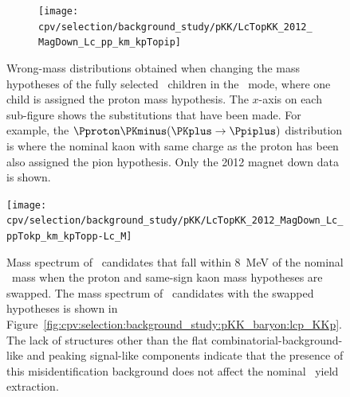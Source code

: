 \begin{figure}
  \begin{subfigure}[b]{0.3\textwidth}
    \texttt{[image: cpv/selection/background\_study/pKK/LcTopKK\_2012\_MagDown\_Lc\_pp\_km\_kpTopip]}
    \caption{\decay{\PLambdac}{\Pproton\PKminus\Ppiplus}}
    \label{fig:cpv:selection:background_study:pKK_baryon:lcp_pkpi}
  \end{subfigure}

  \caption{%
    Wrong-mass distributions obtained when changing the mass hypotheses of the 
    fully selected \PLambdac\ children in the \pKK\ mode, where one child is 
    assigned the proton mass hypothesis.
    The $x$-axis on each sub-figure shows the substitutions that have been 
    made.
    For example, the ${\Pproton\PKminus(\PKplus \to \Ppiplus)}$ distribution is where the 
    nominal kaon with same charge as the proton has been also assigned the pion 
    hypothesis.
    Only the 2012 magnet down data is shown.
  }
  \label{fig:cpv:selection:background_study:pKK_baryon}
\end{figure}

\begin{figure}
  \centering
  \texttt{[image: cpv/selection/background\_study/pKK/LcTopKK\_2012\_MagDown\_Lc\_ppTokp\_km\_kpTopp-Lc\_M]}
  \caption{%
    Mass spectrum of \pKK\ candidates that fall within \SI{8}{\MeV} of the 
    nominal \PLambdac\ mass when the proton and same-sign kaon mass hypotheses 
    are swapped.
    The mass spectrum of \PLambdac\ candidates with the swapped hypotheses is 
    shown in 
    Figure~\ref{fig:cpv:selection:background_study:pKK_baryon:lcp_KKp}.
    The lack of structures other than the flat combinatorial-background-like 
    and peaking signal-like components indicate that the presence of this 
    misidentification background does not affect the nominal \pKK\ yield 
    extraction.
  }
  \label{fig:cpv:selection:background_study:pKK_lcp_KKp_Lc_M}
\end{figure}

